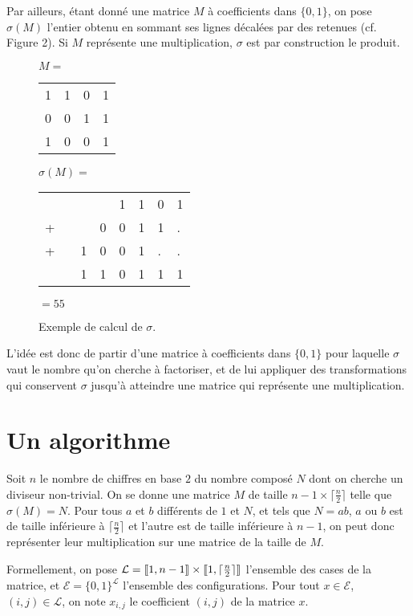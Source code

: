 \documentclass[11pt, openany]{article}
\newcommand{\cg }{[\kern-0.15em [}
\newcommand{\cd}{]\kern-0.15em]}
\newcommand{\La}{\mathcal{L}}
\newcommand{\E}{\mathcal{E}}
\begin{document}
Par ailleurs, étant donné une matrice $M$ à coefficients dans $\{0,1\}$, on pose $\sigma(M)$ l'entier obtenu en sommant ses lignes décalées par des retenues (cf. Figure 2). Si $M$ représente une multiplication, $\sigma$ est par construction le produit. 

\begin{figure}[]
\centering
\begin{minipage}[]{0.3\linewidth}
$M=$
\begin{tabular}{cccc}
1&1&0&1\\
0&0&1&1\\
1&0&0&1\\
\end{tabular}
\end{minipage}
\quad
\begin{minipage}[]{0.6\linewidth}
$\sigma(M)=$
\begin{tabular}{llllllll}
&&&&1&1&0&1\\
+&&&0&0&1&1&.\\
+&&1&0&0&1&.&.\\
\hline
&&1&1&0&1&1&1\\
\end{tabular}
$=55$
\end{minipage}
\caption{Exemple de calcul de $\sigma$.}

\end{figure}

L'idée est donc de partir d'une matrice à coefficients dans $\{0,1\}$ pour laquelle $\sigma$ vaut le nombre qu'on cherche à factoriser, et de lui appliquer des transformations qui conservent $\sigma$ jusqu'à atteindre une matrice qui représente une multiplication.

\section*{Un algorithme}

Soit $n$ le nombre de chiffres en base $2$ du nombre composé $N$ dont on cherche un diviseur non-trivial. On se donne une matrice $M$ de taille $ n-1 \times \lceil \frac{n}{2}\rceil$ telle que $\sigma(M)=N$. Pour tous $a$ et $b$ différents de $1$ et $N$, et tels que $N = ab$, $a$ ou $b$ est de taille inférieure à $\lceil\frac{n}{2}\rceil$ et l'autre est de taille inférieure à $n-1$, on peut donc représenter leur multiplication sur une matrice de la taille de $M$.

Formellement, on pose $\La=\cg 1, n-1 \cd \times \cg 1, \lceil\frac{n}{2}\rceil\cd$ l'ensemble des cases de la matrice, et $\E=\{0,1\}^\La$ l'ensemble des configurations. Pour tout $x \in \E$, $(i,j)\in\La$, on note $x_{i,j}$ le coefficient $(i,j)$ de la matrice $x$. 
\end{document}
